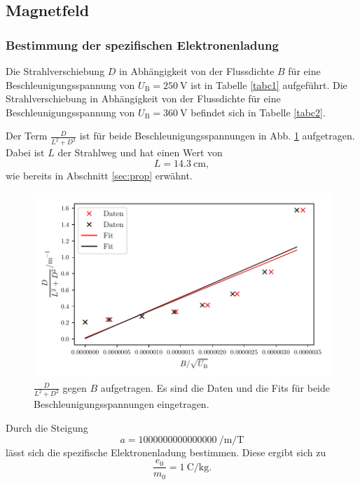 \subsection{Magnetfeld}
\subsubsection{Bestimmung der spezifischen Elektronenladung}
Die Strahlverschiebung $D$ in Abhängigkeit von der Flussdichte $B$
für eine Beschleunigungsspannung von $U_\text{B} = \SI{250}{\volt}$
ist in Tabelle \ref{tabc1} aufgeführt. Die Strahlverschiebung in
Abhängigkeit von der Flussdichte für eine Beschleunigungsspannung
von $U_\text{B} = \SI{360}{\volt}$ befindet sich in Tabelle \ref{tabc2}.



\noindent Der Term $\frac{D}{L^2 + D^2}$ ist für beide Beschleunigungsspannungen
in Abb. \ref{fig:plot2} aufgetragen. Dabei ist $L$ der Strahlweg und
hat einen Wert von
\begin{equation*}
    L = \SI{14.3}{\centi\meter},
\end{equation*}
wie bereits in Abschnitt \ref{sec:prop} erwähnt.

\begin{figure}
    \centering
    \includegraphics[width=12cm, height=7cm]{build/plot2.pdf}
    \caption{$\frac{D}{L^2 + D^2}$ gegen $B$ aufgetragen.
    Es sind die Daten und die Fits für beide Beschleunigungsspannungen
    eingetragen.}
    \label{fig:plot2}
\end{figure}

\noindent Durch die Steigung
\begin{equation*}
    a = \SI{1000000000000000}{\per\meter\per\tesla} %
\end{equation*}
lässt sich die spezifische Elektronenladung bestimmen.
Diese ergibt sich zu
\begin{equation*}
    \frac{e_0}{m_0} = \SI{1}{\coulomb\per\kilogram}.
\end{equation*}

